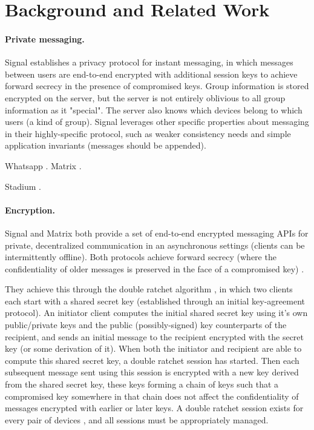 \section{Background and Related Work}

\paragraph{Private messaging.}
Signal \cite{signal} establishes a privacy protocol for instant messaging, in which messages between users are end-to-end encrypted with additional session keys to achieve forward secrecy in the presence of compromised keys. Group information is stored encrypted on the server, but the server is not entirely oblivious to all group information as it "special". The server also knows which devices belong to which users (a kind of group). Signal leverages other specific properties about messaging in their highly-specific protocol, such as weaker consistency needs and simple application invariants (messages should be appended).

Whatsapp \cite{whatsapp}.
Matrix \cite{matrix}.

Stadium \cite{stadium}. 

\paragraph{Encryption.} 
Signal \cite{signal} and Matrix \cite{matrix} both provide a set of end-to-end 
encrypted messaging APIs for private, decentralized communication in an 
asynchronous settings (clients 
can be intermittently offline). Both protocols achieve forward secrecy (where
the confidentiality of older messages is preserved in the face of a compromised
key) 
.

They achieve this through the double ratchet algorithm \cite{}, in which
two clients each start with a shared secret key (established through an initial
key-agreement protocol). An initiator client computes the initial shared secret 
key using it's own public/private keys and the public (possibly-signed) key
counterparts of the recipient, and sends an initial message to the recipient
encrypted with the secret key (or some derivation of it). When both the initiator
and recipient are able to compute this shared secret key, a double ratchet session
has started. Then each subsequent message sent using this session is encrypted with
a new key derived from the shared secret key, these keys forming a chain of keys
such that a compromised key somewhere in that chain does not affect the 
confidentiality of messages encrypted with earlier or later keys.  A double
ratchet session exists for every pair of devices , and all sessions must be appropriately managed. 

